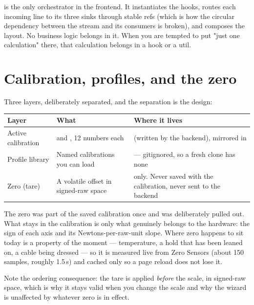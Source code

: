 \documentclass[11pt,a4paper]{article}
\begin{document}
 is the only orchestrator in the frontend. It
instantiates the hooks, routes each incoming line to its three sinks through
stable refs (which is how the circular dependency between the stream and its
consumers is broken), and composes the layout. No business logic belongs in it.
When you are tempted to put "just one calculation" there, that calculation
belongs in a hook or a util.

\section{Calibration, profiles, and the zero}

Three layers, deliberately separated, and the separation is the design:

\begin{center}
\begin{tabular}{@{}L{3.2cm}L{5.0cm}L{6.8cm}@{}}
\toprule
\textbf{Layer} & \textbf{What} & \textbf{Where it lives} \\
\midrule
Active calibration &
   and , 12 numbers each &
   (written by the backend),
  mirrored in  \\
Profile library &
  Named calibrations you can load &
   --- gitignored, so a fresh clone has none \\
Zero (tare) &
  A volatile offset in signed-raw space &
   only. Never saved with the calibration,
  never sent to the backend \\
\bottomrule
\end{tabular}
\end{center}

The zero was part of the saved calibration once and was deliberately pulled out.
What stays in the calibration is only what genuinely belongs to the hardware:
the sign of each axis and its Newtons-per-raw-unit slope. Where zero happens to
sit today is a property of the moment --- temperature, a hold that has been
leaned on, a cable being dressed --- so it is measured live from
\textsf{Zero Sensors} (about 150 samples, roughly 1.5\,s) and cached only so a
page reload does not lose it.

Note the ordering consequence: the tare is applied \emph{before} the scale, in
signed-raw space, which is why it stays valid when you change the scale and why
the wizard is unaffected by whatever zero is in effect.
\end{document}
